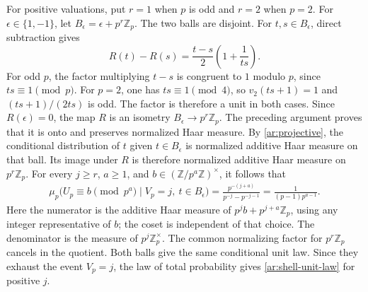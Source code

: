 \documentclass[twoside]{aomart}
\makeatletter
\theoremstyle{paperplain}
\theoremstyle{paperdefinition}
\renewenvironment{proof}[1][\proofname]{\par\pushQED{\qed}%
  \normalfont\topsep6\p@\@plus3\p@\relax\trivlist
  \item[\hskip\labelsep\itshape #1\@addpunct{.}]\ignorespaces
}{\popQED\endtrivlist\@endpefalse}
\newcommand{\Z}{\mathbb Z}
\numberwithin{equation}{section}
\makeatother
\begin{document}
\begin{proof}
For positive valuations, put $r=1$ when $p$ is odd and
$r=2$ when $p=2$. For $\epsilon\in\{1,-1\}$, let
$B_\epsilon=\epsilon+p^r\Z_p$. The two balls are disjoint.
For $t,s\in B_\epsilon$, direct subtraction gives
\begin{equation*}
 R(t)-R(s)=\frac{t-s}{2}\left(1+\frac1{ts}\right).
\end{equation*}
For odd $p$, the factor multiplying $t-s$ is congruent
to $1$ modulo $p$, since $ts\equiv1\pmod p$.
For $p=2$, one has $ts\equiv1\pmod4$, so
$v_2(ts+1)=1$ and $(ts+1)/(2ts)$ is odd.
The factor is therefore a unit in both cases. Since
$R(\epsilon)=0$, the map $R$ is an isometry
$B_\epsilon\to p^r\Z_p$. The preceding argument proves
that it is onto and preserves normalized Haar measure.
By \eqref{ar:projective}, the conditional distribution
of $t$ given $t\in B_\epsilon$ is normalized additive
Haar measure on that ball. Its image under $R$ is
therefore normalized additive Haar measure on $p^r\Z_p$.
For every $j\ge r$, $a\ge1$, and
$b\in(\Z/p^a\Z)^\times$, it follows that
\begin{equation*}
 \begin{aligned}
 \mu_p\bigl(U_p\equiv b\pmod{p^a}
          \mid V_p=j,\ t\in B_\epsilon\bigr)
   =\frac{p^{-(j+a)}}{p^{-j}-p^{-j-1}}
   =\frac1{(p-1)p^{a-1}}.
 \end{aligned}
\end{equation*}
Here the numerator is the additive Haar measure of
$p^j b+p^{j+a}\Z_p$, using any integer representative
of $b$; the coset is independent of that choice.
The denominator is the measure of $p^j\Z_p^\times$.
The common normalizing factor for
$p^r\Z_p$ cancels in the quotient. Both balls give the
same conditional unit law. Since they exhaust the
event $V_p=j$, the law of total probability gives
\eqref{ar:shell-unit-law} for positive $j$.


\end{proof}
\end{document}
